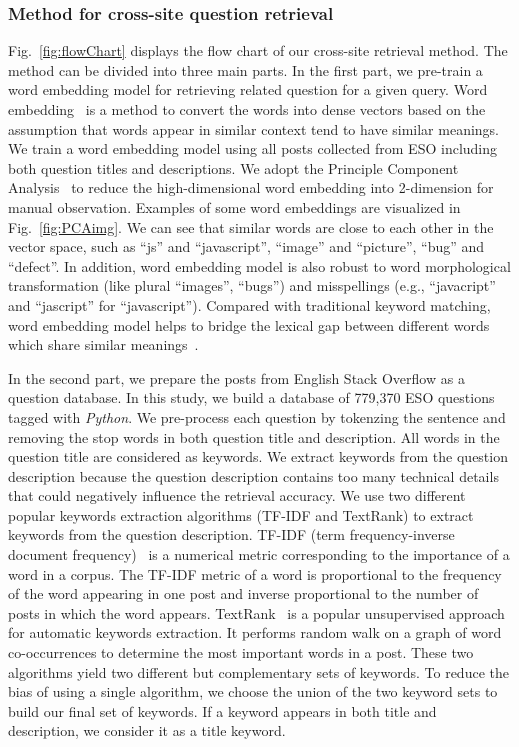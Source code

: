 \subsubsection{Method for cross-site question retrieval}
Fig.~\ref{fig:flowChart} displays the flow chart of our cross-site retrieval method.
The method can be divided into three main parts.
In the first part, we pre-train a word embedding model for retrieving related question for a given query. 
Word embedding~\cite{mikolov2013distributed} is a method to convert the words into dense vectors based on the assumption that words appear in similar context tend to have similar meanings. 
We train a word embedding model using all posts collected from ESO including both question titles and descriptions.
We adopt the Principle Component Analysis~\cite{jolliffe1986principal} to reduce the high-dimensional word embedding into 2-dimension for manual observation.
Examples of some word embeddings are visualized in Fig.~\ref{fig:PCAimg}.
We can see that similar words are close to each other in the vector space, such as ``js'' and ``javascript'', ``image'' and ``picture'', ``bug'' and ``defect''.
In addition, word embedding model is also robust to word morphological transformation (like plural ``images'', ``bugs'') and misspellings (e.g., ``javacript'' and ``jascript'' for ``javascript'').  
Compared with traditional keyword matching, word embedding model helps to bridge the lexical gap between different words which share similar meanings~\cite{chen2016learning}. 

In the second part, we prepare the posts from English Stack Overflow as a question database.
In this study, we build a database of 779,370 ESO questions tagged with \textit{Python}.
We pre-process each question by tokenzing the sentence and removing the stop words in both question title and description.
All words in the question title are considered as keywords.
We extract keywords from the question description because the question description contains too many technical details that could negatively influence the retrieval accuracy. 
We use two different popular keywords extraction algorithms (TF-IDF and TextRank) to extract keywords from the question description. 
TF-IDF (term frequency-inverse document frequency)~\cite{sparck1972statistical} is a numerical metric corresponding to the importance of a word in a corpus.
The TF-IDF metric of a word is proportional to the frequency of the word appearing in one post and inverse proportional to the number of posts in which the word appears.
TextRank~\cite{mihalcea2004textrank} is a popular unsupervised approach for automatic keywords extraction. 
It performs random walk on a graph of word co-occurrences to determine the most important words in a post.
These two algorithms yield two different but complementary sets of keywords. 
To reduce the bias of using a single algorithm, we choose the union of the two keyword sets to build our final set of keywords.
If a keyword appears in both title and description, we consider it as a title keyword.

